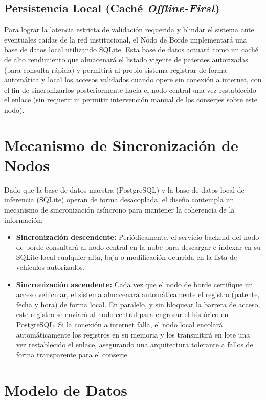 \subsection{Persistencia Local (Caché \textit{Offline-First})}
Para lograr la latencia estricta de validación requerida y blindar el sistema ante eventuales caídas de la red institucional, el Nodo de Borde implementará una base de datos local utilizando SQLite. Esta base de datos actuará como un caché de alto rendimiento que almacenará el listado vigente de patentes autorizadas (para consulta rápida) y permitirá al propio sistema registrar de forma automática y local los accesos validados cuando opere sin conexión a internet, con el fin de sincronizarlos posteriormente hacia el nodo central una vez restablecido el enlace (sin requerir ni permitir intervención manual de los conserjes sobre este nodo).

\section{Mecanismo de Sincronización de Nodos}

Dado que la base de datos maestra (PostgreSQL) y la base de datos local de inferencia (SQLite) operan de forma desacoplada, el diseño contempla un mecanismo de sincronización asíncrono para mantener la coherencia de la información:

\begin{itemize}
    \item \textbf{Sincronización descendente:} Periódicamente, el servicio backend del nodo de borde consultará al nodo central en la nube para descargar e indexar en su SQLite local cualquier alta, baja o modificación ocurrida en la lista de vehículos autorizados.
    \item \textbf{Sincronización ascendente:} Cada vez que el nodo de borde certifique un acceso vehicular, el sistema almacenará automáticamente el registro (patente, fecha y hora) de forma local. En paralelo, y sin bloquear la barrera de acceso, este registro se enviará al nodo central para engrosar el histórico en PostgreSQL. Si la conexión a internet falla, el nodo local encolará automáticamente los registros en su memoria y los transmitirá en lote una vez restablecido el enlace, asegurando una arquitectura tolerante a fallos de forma transparente para el conserje.
\end{itemize}

\section{Modelo de Datos}

